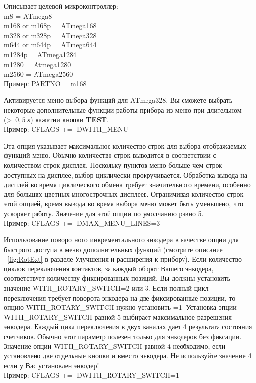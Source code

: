 \begin{description} \setlength{\itemsep}{0em}
  \item[PARTNO] Описывает целевой микроконтроллер:\\
         m8 = ATmega8\\
         m168 or m168p	= ATmega168\\
         m328 or m328p	= ATmega328\\
         m644 or m644p	= ATmega644\\
         m1284p		= ATmega1284\\
         m1280		= Atmega1280\\
         m2560		= ATmega2560\\   
Пример:  PARTNO = m168

  \item[WITH\_MENU] Активируется меню выбора функций для ATmega328. Вы сможете выбрать некоторые дополнительные 
  функции работы прибора из меню при длительном (\textgreater~\(0,5~s\)) нажатии кнопки \textbf{ TEST}.\\
Пример: CFLAGS += -DWITH\_MENU

 \item[MAX\_MENU\_LINES]
Эта опция указывает максимальное количество строк для выбора отображаемых функций меню.
Обычно количество строк выводится в соответствии с количеством строк дисплея.
Поскольку пунктов меню больше чем строк доступных на дисплее, выбор циклически прокручивается.
Обработка вывода на дисплей во время циклического обмена требует значительного времени,
особенно для больших цветных многострочных дисплеев.
Ограничивая количество строк этой опцией, время вывода во время выбора меню может быть уменьшено,
что ускоряет работу.
Значение для этой опции по умолчанию равно 5.\\
Пример: CFLAGS += -DMAX\_MENU\_LINES=3

  \item[WITH\_ROTARY\_SWITCH] Использование поворотного инкрементального энкодера в
качестве опции для быстрого доступа в меню дополнительных функций (смотрите описание
~\ref{fig:RotExt} в разделе Улучшения и расширения к прибору).
Если количество циклов переключения контактов, за каждый оборот Вашего энкодера, соответствует количеству 
фиксированных позиций, Вы должны установить значение WITH\_ROTARY\_SWITCH=2 или 3. Если полный цикл переключения 
требует поворота энкодера на две фиксированные позиции, то опцию WITH\_ROTARY\_SWITCH нужно установить =1.
Установка опции WITH\_ROTARY\_SWITCH равной 5 выбирает максимальное разрешения энкодера. Каждый цикл переключения 
в двух каналах дает 4 результата состояния счетчиков. Обычно этот параметр полезен только для энкодеров без фиксации.
Значение опции WITH\_ROTARY\_SWITCH равной 4 необходимо, если установлено две отдельные кнопки 
 и  вместо энкодера. Не используйте значение 4 если у Вас установлен энкодер!\\
Пример: CFLAGS += -DWITH\_ROTARY\_SWITCH=1


\end{description}
